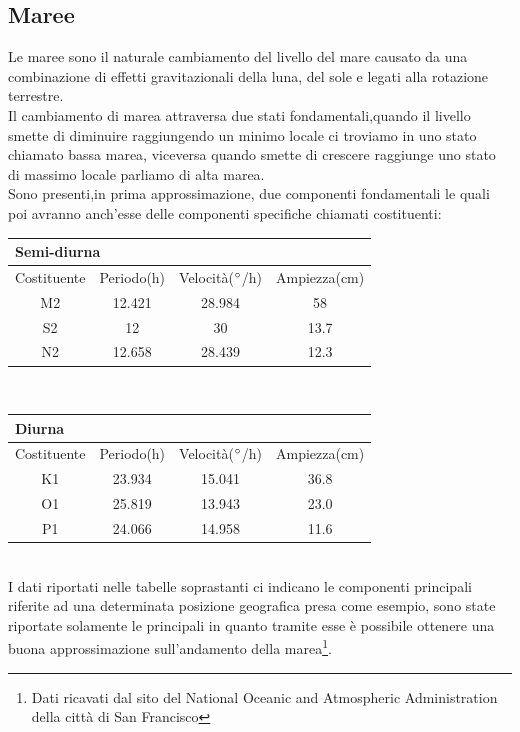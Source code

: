 \subsection{Maree}
Le maree sono il naturale cambiamento del livello del mare causato da una combinazione di effetti gravitazionali della luna, del sole e legati alla rotazione terrestre.\\Il cambiamento di marea attraversa due stati fondamentali,quando il livello smette di diminuire raggiungendo un minimo locale ci troviamo in uno stato chiamato bassa marea, viceversa quando smette di crescere raggiunge uno stato di massimo locale parliamo di alta marea.\\
Sono presenti,in prima approssimazione, due componenti fondamentali le quali poi avranno anch'esse delle componenti specifiche chiamati costituenti:\\

\vspace{0,5em}\noindent
\begin{tabular}{|c|c|c|c|}
\hline
\multicolumn{4}{|l|}{Semi-diurna}\\
\hline
Costituente & Periodo(h) & Velocità($\degree$/h) & Ampiezza(cm) \\ 
\hline
M2  & 12.421 & 28.984 & 58  \\ \hline
S2  & 12 & 30 & 13.7  \\ \hline
N2  & 12.658 & 28.439 & 12.3  \\\hline
\end{tabular}\\

\vspace{1em}\noindent
\begin{tabular}{|c|c|c|c|}
\hline
\multicolumn{4}{|l|}{Diurna}\\
\hline
Costituente & Periodo(h) & Velocità($\degree$/h) & Ampiezza(cm) \\ 
\hline
K1  & 23.934 & 15.041 & 36.8 \\ \hline
O1  & 25.819 & 13.943 & 23.0 \\ \hline
P1 & 24.066 & 14.958 & 11.6 \\\hline
\end{tabular}\\

\vspace{1em}
\noindent
I dati riportati nelle tabelle soprastanti ci indicano le componenti principali riferite ad una determinata posizione geografica presa come esempio, sono state riportate solamente le principali in quanto tramite esse è possibile ottenere una buona approssimazione sull'andamento della marea\footnote{Dati ricavati dal sito del National Oceanic and Atmospheric Administration della città di San Francisco}.

